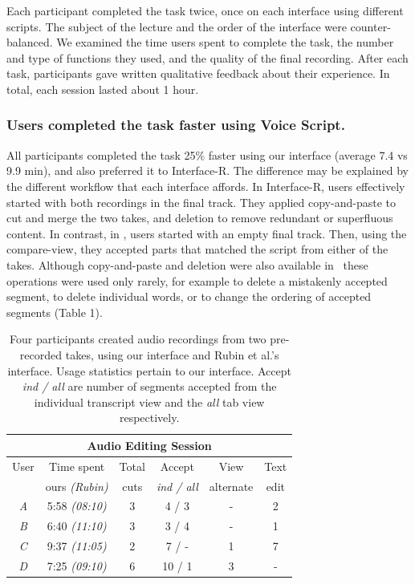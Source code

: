 Each participant completed the task twice, once on each interface using different scripts.
The subject of the lecture and the order of the interface were
counter-balanced. We examined the time users spent to complete the task, the number and type of functions they used, and the quality of the
final recording. After each task, participants gave written
qualitative feedback about their experience. In total, each session lasted about 1 hour. 

\subsubsection{Users completed the task faster using Voice Script.} All participants completed the task 25\% faster using our interface (average 7.4  vs 9.9 min), and also preferred it to Interface-R. The difference may be explained by the different workflow that each interface affords. In Interface-R, users effectively started with both recordings in the final track. They applied copy-and-paste to cut and merge the two takes, and deletion to remove redundant or superfluous content. In contrast, in \voicescript , users started with an empty final track. Then, using the compare-view, they accepted parts that matched the script from either of the takes. Although copy-and-paste and deletion were also available in \voicescript\ these operations were used only rarely, for example to delete a mistakenly accepted segment, to delete individual words, or to change the ordering of accepted segments (Table 1). \\
%
\begin{table}[!h]
\center
{}
\begin{tabular}{c|cccccc}
\multicolumn{7}{c}{\textbf{Audio Editing Session}}\\\hline
{User}&\multicolumn{2}{c}{Time spent}& {Total} & {Accept}
&{View}&{Text} \\
{}&\multicolumn{2}{c}{ours \textit{(Rubin)}}&{cuts}&{\textit{ind
/ all}}&{alternate}&{edit}
\\\hline
\textit{A}&\multicolumn{2}{c}{5:58 \textit{(08:10)}}&{3}& {4
/ 3}&{-}&{2}\\
\textit{B}  &\multicolumn{2}{c}{6:40 \textit{(11:10)}}&{3}&{3
/ 4}&{-}&{1}\\
\textit{C}&\multicolumn{2}{c}{9:37 \textit{(11:05)}}&{2}& {7
/ -}&{1}&{7}\\
\textit{D}&\multicolumn{2}{c}{7:25 \textit{(09:10)}}&{6}& {10
/ 1}&{3}&{-}
\\\hline
\end{tabular} 
\label{tab:editing}
\caption{Four participants created audio
recordings from two pre-recorded takes, using our interface and
Rubin et al.'s interface. Usage statistics pertain to our interface.
Accept \textit{ind / all} are number of segments accepted from
the individual transcript view and the \textit{all} tab view
respectively.}
\end{table} 

